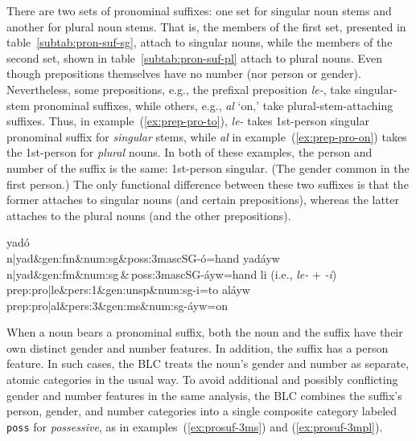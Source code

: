 {\begin{description}
There are two sets
of pronominal suffixes: one set for singular noun stems and another for plural noun stems. 
That is, the members of the first set, presented in table~\ref{subtab:pron-suf-sg}, 
attach to singular nouns, while the members of the second set, shown in table~\ref{subtab:pron-suf-pl} 
attach to plural nouns. 
Even though prepositions themselves have no number (nor person or gender). 
Nevertheless, some prepositions, e.g., the prefixal preposition \textit{le-}, 
take singular-stem pronominal suffixes, while others, e.g., \textit{al} `on,'
take plural-stem-attaching suffixes. Thus, in example~(\ref{ex:prep-pro-to}), 
\textit{le-} takes 1st-person singular pronominal suffix for \emph{singular} stems, 
while \textit{al} in example~(\ref{ex:prep-pro-on}) takes the 1st-person 
for \emph{plural} nouns. In both of these examples, the person and number of 
the suffix is the same: 1st-person singular. (The gender common in the first person.)
The only functional difference between these two suffixes is that the former 
attaches to singular nouns (and certain prepositions), whereas the latter 
attaches to the plural nouns (and the other prepositions). 
\begin{exe}
\ex \label{ex:prosuf-3ms}
{\selectfont \small
yad\'{o} \\
n|yad\&gen:fm\&num:sg\&poss:3mascSG-\'{o}=hand
}
\ex \label{ex:prosuf-3mpl}
{\selectfont \small
yad\'{a}yw \\
n|yad\&gen:fm\&num:sg\,\&\,poss:3mascSG-\'{a}yw=hand
}
\ex \label{ex:prep-pro-to}
{\selectfont \small
li \qquad \textrm{(i.e., \textit{le-} + \textit{-i})} \\
prep:pro|le\&pers:1\&gen:unsp\&num:sg-i=to
}
\ex \label{ex:prep-pro-on}
{\selectfont \small
{}al\'{a}yw  \\
prep:pro|al\&pers:3\&gen:ms\&num:sg-\'{a}yw=on
}
\end{exe}

When a noun bears a pronominal suffix, both the noun and the suffix have their 
own distinct gender and number features. In addition, the suffix has a person feature. 
In such cases, the BLC treats the noun's gender and number as separate, atomic
categories in the usual way. To avoid additional and possibly conflicting gender 
and number features in the same
analysis, the BLC combines the suffix's person, gender, and number categories into 
a single composite category labeled \texttt{poss} for \textit{possessive}, as in 
examples~(\ref{ex:prosuf-3ms}) and (\ref{ex:prosuf-3mpl}).


\end{description}}
